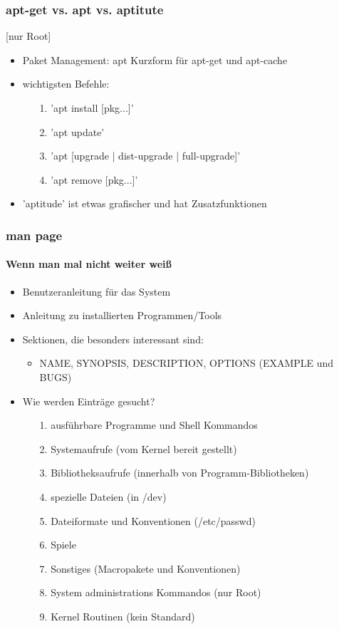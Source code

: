 \documentclass[12pt,utf8]{beamer}
\begin{document}
\begin{frame}
\frametitle{apt-get vs. apt vs. aptitute}
[nur Root]
\begin{itemize}
	\item Paket Management: apt Kurzform für apt-get und apt-cache
	\item wichtigsten Befehle:
	\begin{itemize}
		\item[1.] 'apt install [pkg...]'
		\item[2.] 'apt update'
		\item[3.] 'apt [upgrade | dist-upgrade | full-upgrade]'
		\item[4.] 'apt remove [pkg...]'
	\end{itemize}
	\item 'aptitude' ist etwas grafischer und hat Zusatzfunktionen
\end{itemize}
\end{frame}

\begin{frame}
\frametitle{man page}
\framesubtitle{Wenn man mal nicht weiter weiß}
\begin{itemize}
	\item Benutzeranleitung für das System
	\item Anleitung zu installierten Programmen/Tools
	\item Sektionen, die besonders interessant sind:
	\begin{itemize}
		\item NAME, SYNOPSIS, DESCRIPTION, OPTIONS (EXAMPLE und BUGS)
	\end{itemize}
	\item Wie werden Einträge gesucht?
	\begin{itemize}
		\item[1.] ausführbare Programme und Shell Kommandos
		\item[2.] Systemaufrufe (vom Kernel bereit gestellt)
		\item[3.] Bibliotheksaufrufe (innerhalb von Programm-Bibliotheken)
		\item[4.] spezielle Dateien (in /dev)
		\item[5.] Dateiformate und Konventionen (/etc/passwd)
		\item[6.] Spiele
		\item[7.] Sonstiges (Macropakete und Konventionen)
		\item[8.] System administrations Kommandos (nur Root)
		\item[9.] Kernel Routinen (kein Standard)
	\end{itemize}
\end{itemize}
\end{frame}
\end{document}
